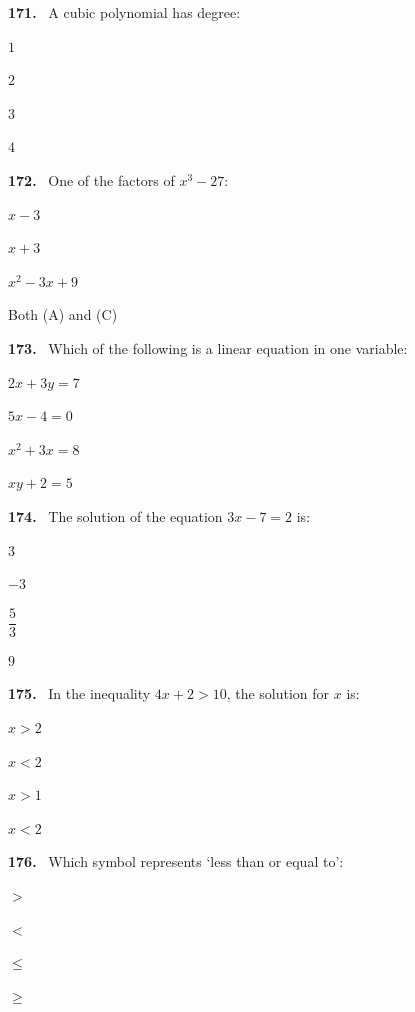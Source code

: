 \documentclass[11pt]{article}
\newenvironment{qenv}[1]{%
  \par\medskip\noindent\textbf{#1.}\ \ignorespaces
}{\par}
\begin{document}
\begin{qenv}{171} A cubic polynomial has degree:
\begin{options} \item $1$ \item $2$ \item $3$ \item $4$ \end{options} \end{qenv}

\begin{qenv}{172} One of the factors of $x^3-27$:
\begin{options} \item $x-3$ \item $x+3$ \item $x^2-3x+9$ \item Both (A) and (C) \end{options} \end{qenv}

\begin{qenv}{173} Which of the following is a linear equation in one variable:
\begin{options} \item $2x+3y=7$ \item $5x-4=0$ \item $x^2+3x=8$ \item $xy+2=5$ \end{options} \end{qenv}

\begin{qenv}{174} The solution of the equation $3x-7=2$ is:
\begin{options} \item $3$ \item $-3$ \item $\dfrac{5}{3}$ \item $9$ \end{options} \end{qenv}

\begin{qenv}{175} In the inequality $4x+2>10$, the solution for $x$ is:
\begin{options} \item $x>2$ \item $x<2$ \item $x>1$ \item $x<2$ \end{options} \end{qenv}

\begin{qenv}{176} Which symbol represents `less than or equal to':
\begin{options} \item $>$ \item $<$ \item $\leq$ \item $\geq$ \end{options} \end{qenv}
\end{document}
